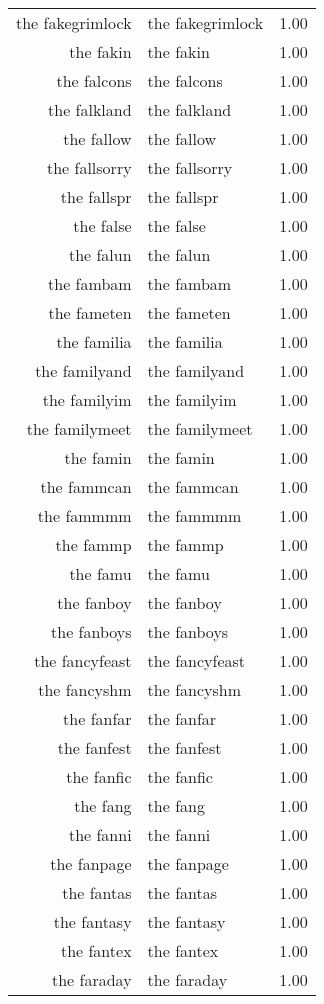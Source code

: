 \begin{table}[ht]
\begin{tabular}{rlr}
  the fakegrimlock & the fakegrimlock & 1.00 \\ 
  the fakin & the fakin & 1.00 \\ 
  the falcons & the falcons & 1.00 \\ 
  the falkland & the falkland & 1.00 \\ 
  the fallow & the fallow & 1.00 \\ 
  the fallsorry & the fallsorry & 1.00 \\ 
  the fallspr & the fallspr & 1.00 \\ 
  the false & the false & 1.00 \\ 
  the falun & the falun & 1.00 \\ 
  the fambam & the fambam & 1.00 \\ 
  the fameten & the fameten & 1.00 \\ 
  the familia & the familia & 1.00 \\ 
  the familyand & the familyand & 1.00 \\ 
  the familyim & the familyim & 1.00 \\ 
  the familymeet & the familymeet & 1.00 \\ 
  the famin & the famin & 1.00 \\ 
  the fammcan & the fammcan & 1.00 \\ 
  the fammmm & the fammmm & 1.00 \\ 
  the fammp & the fammp & 1.00 \\ 
  the famu & the famu & 1.00 \\ 
  the fanboy & the fanboy & 1.00 \\ 
  the fanboys & the fanboys & 1.00 \\ 
  the fancyfeast & the fancyfeast & 1.00 \\ 
  the fancyshm & the fancyshm & 1.00 \\ 
  the fanfar & the fanfar & 1.00 \\ 
  the fanfest & the fanfest & 1.00 \\ 
  the fanfic & the fanfic & 1.00 \\ 
  the fang & the fang & 1.00 \\ 
  the fanni & the fanni & 1.00 \\ 
  the fanpage & the fanpage & 1.00 \\ 
  the fantas & the fantas & 1.00 \\ 
  the fantasy & the fantasy & 1.00 \\ 
  the fantex & the fantex & 1.00 \\ 
  the faraday & the faraday & 1.00 \\ 

\end{tabular}
\end{table}
